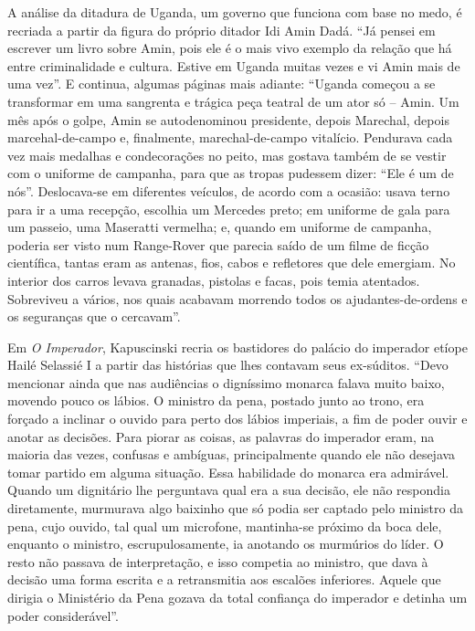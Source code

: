 A análise da ditadura de Uganda, um governo que funciona com base no
medo, é recriada a partir da figura do próprio ditador Idi Amin Dadá.
``Já pensei em escrever um livro sobre Amin, pois ele é o mais vivo
exemplo da relação que há entre criminalidade e cultura. Estive em
Uganda muitas vezes e vi Amin mais de uma vez''. E continua, algumas
páginas mais adiante: ``Uganda começou a se transformar em uma sangrenta
e trágica peça teatral de um ator só -- Amin. Um mês após o golpe, Amin
se autodenominou presidente, depois Marechal, depois marcehal-de-campo
e, finalmente, marechal-de-campo vitalício. Pendurava cada vez mais
medalhas e condecorações no peito, mas gostava também de se vestir com o
uniforme de campanha, para que as tropas pudessem dizer: ``Ele é um de
nós''. Deslocava-se em diferentes veículos, de acordo com a ocasião:
usava terno para ir a uma recepção, escolhia um Mercedes preto; em
uniforme de gala para um passeio, uma Maseratti vermelha; e, quando em
uniforme de campanha, poderia ser visto num Range-Rover que parecia
saído de um filme de ficção científica, tantas eram as antenas, fios,
cabos e refletores que dele emergiam. No interior dos carros levava
granadas, pistolas e facas, pois temia atentados. Sobreviveu a vários,
nos quais acabavam morrendo todos os ajudantes-de-ordens e os seguranças
que o cercavam''.

Em \emph{O Imperador}, Kapuscinski recria os bastidores do palácio do
imperador etíope Hailé Selassié I a partir das histórias que lhes
contavam seus ex-súditos. ``Devo mencionar ainda que nas audiências o
digníssimo monarca falava muito baixo, movendo pouco os lábios. O
ministro da pena, postado junto ao trono, era forçado a inclinar o
ouvido para perto dos lábios imperiais, a fim de poder ouvir e anotar as
decisões. Para piorar as coisas, as palavras do imperador eram, na
maioria das vezes, confusas e ambíguas, principalmente quando ele não
desejava tomar partido em alguma situação. Essa habilidade do monarca
era admirável. Quando um dignitário lhe perguntava qual era a sua
decisão, ele não respondia diretamente, murmurava algo baixinho que só
podia ser captado pelo ministro da pena, cujo ouvido, tal qual um
microfone, mantinha-se próximo da boca dele, enquanto o ministro,
escrupulosamente, ia anotando os murmúrios do líder. O resto não passava
de interpretação, e isso competia ao ministro, que dava à decisão uma
forma escrita e a retransmitia aos escalões inferiores. Aquele que
dirigia o Ministério da Pena gozava da total confiança do imperador e
detinha um poder considerável''.

